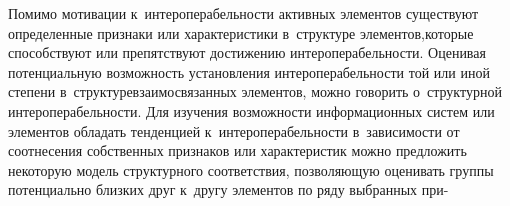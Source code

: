\begin{multicols}{2}
     Помимо мотивации к~ин\-тер\-опе\-ра\-бель\-ности активных элементов 
существуют определенные признаки или характеристики в~структуре 
элементов,\linebreak которые способствуют или препятствуют достижению 
ин\-тер\-опе\-ра\-бель\-ности. Оценивая потенциальную возможность установления 
ин\-тер\-опе\-ра\-бель\-ности той или иной степени в~структуре\linebreak взаимосвязанных 
элементов, можно говорить о~структурной ин\-тер\-опе\-ра\-бель\-ности. Для 
изучения возможности информационных сис\-тем или элементов обладать 
тенденцией к~ин\-тер\-опе\-ра\-бель\-ности в~за\-ви\-си\-мости от соотнесения 
собственных признаков или характеристик мож\-но предложить некоторую 
модель структурного соответствия, поз\-во\-ля\-ющую оценивать группы 
потенциально близ\-ких друг к~другу элементов по ряду выбранных при-\linebreak\vspace*{-12pt}

\pagebreak

\end{multicols}

\begin{figure*} %
\vspace*{1pt}
\begin{center}
   \mbox{%
\epsfxsize=163mm
}
\end{center}
\vspace*{-9pt}
\vspace*{-3pt}
\end{figure*}

